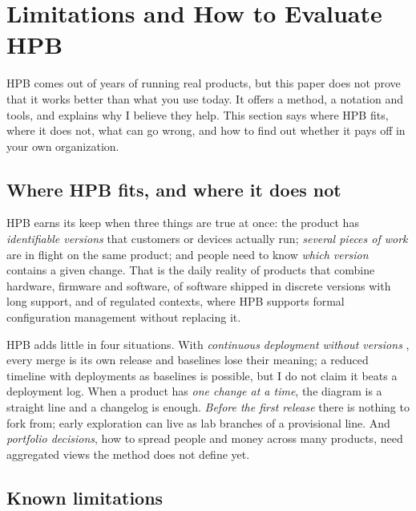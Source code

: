 \section{Limitations and How to Evaluate HPB}
\label{sec:limitations}

HPB comes out of years of running real products, but this paper does not
prove that it works better than what you use today. It offers a method, a
notation and tools, and explains why I believe they help. This section says
where HPB fits, where it does not, what can go wrong, and how to find out
whether it pays off in your own organization.

\subsection{Where HPB fits, and where it does not}
\label{sec:limitations-fit}

HPB earns its keep when three things are true at once: the product has
\emph{identifiable versions} that customers or devices actually run;
\emph{several pieces of work} are in flight on the same product; and people
need to know \emph{which version} contains a given change. That is the daily
reality of products that combine hardware, firmware and software, of
software shipped in discrete versions with long support, and of regulated
contexts, where HPB supports formal configuration management
\citep{ieee828,iso10007} without replacing it.

HPB adds little in four situations. With \emph{continuous deployment
without versions} \citep{humble2010cd}, every merge is its own release and
baselines lose their meaning; a reduced timeline with deployments as
baselines is possible, but I do not claim it beats a deployment log. When
a product has \emph{one change at a time}, the diagram is a straight line
and a changelog is enough. \emph{Before the first release} there is
nothing to fork from; early exploration can live as lab branches of a
provisional line. And \emph{portfolio decisions}, how to spread people and
money across many products, need aggregated views the method does not
define yet.

\subsection{Known limitations}
\label{sec:limitations-known}

